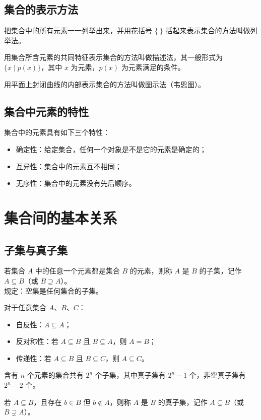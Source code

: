 \subsection{集合的表示方法}
\begin{definition}[列举法]
把集合中的所有元素一一列举出来，并用花括号 $\{\ \}$ 括起来表示集合的方法叫做列举法。
\end{definition}
\begin{definition}[描述法]
用集合所含元素的共同特征表示集合的方法叫做描述法，其一般形式为 $\{x \mid p(x)\}$，其中 $x$ 为元素，$p(x)$ 为元素满足的条件。
\end{definition}
\begin{definition}[图示法]
用平面上封闭曲线的内部表示集合的方法叫做图示法（韦恩图）。
\end{definition}
\subsection{集合中元素的特性}
\begin{definition}
集合中的元素具有如下三个特性：
\begin{itemize}
    \item 确定性：给定集合，任何一个对象是不是它的元素是确定的；
    \item 互异性：集合中的元素互不相同；
    \item 无序性：集合中的元素没有先后顺序。
\end{itemize}
\end{definition}

\section{集合间的基本关系}
\subsection{子集与真子集}
\begin{definition}[子集]
若集合 $A$ 中的任意一个元素都是集合 $B$ 的元素，则称 $A$ 是 $B$ 的子集，记作 $A \subseteq B$（或 $B \supseteq A$）。\\
规定：空集是任何集合的子集。
\end{definition}
\begin{theorem}[子集的性质]
对于任意集合 $A$、$B$、$C$：
\begin{itemize}
    \item 自反性：$A \subseteq A$；
    \item 反对称性：若 $A \subseteq B$ 且 $B \subseteq A$，则 $A=B$；
    \item 传递性：若 $A \subseteq B$ 且 $B \subseteq C$，则 $A \subseteq C$。
\end{itemize}
\end{theorem}
\begin{corollary}[子集个数]
含有 $n$ 个元素的集合共有 $2^n$ 个子集，其中真子集有 $2^n-1$ 个，非空真子集有 $2^n-2$ 个。
\end{corollary}
\begin{definition}[真子集]
若 $A \subseteq B$，且存在 $b \in B$ 但 $b \notin A$，则称 $A$ 是 $B$ 的真子集，记作 $A \subsetneq B$（或 $B \supsetneq A$）。
\end{definition}
